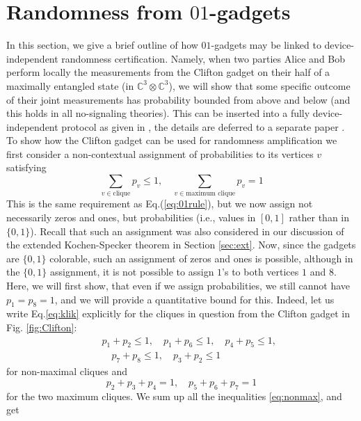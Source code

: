 \documentclass[twocolumn, a4paper, superscriptaddress,nofootinbib, accepted=2020-08-07, hyperref]{quantumarticle}
\def\be{\begin{equation}}
\def\ee{\end{equation}}
\def\ben{\begin{eqnarray}}
\def\een{\end{eqnarray}}
\def\be{\begin{equation}}
\def\ee{\end{equation}}
\begin{document}
\section{Randomness from $01$-gadgets}
In this section, we give a brief outline of how $01$-gadgets may be linked to device-independent randomness certification.
Namely, when two parties Alice and Bob perform locally the measurements from the Clifton gadget on their half of a maximally entangled state (in $\mathbb{C}^3 \otimes \mathbb{C}^3$), we will show that some specific outcome of their joint measurements has probability bounded from above and below (and this holds in all no-signaling theories). This can be
inserted into a fully device-independent protocol as given in \cite{PRL-rand}, the details are deferred to a separate paper \cite{R17}.
To show how the Clifton gadget can be used for randomness amplification we first consider a non-contextual assignment
of probabilities to its vertices $v$ satisfying
\be
\label{eq:klik}
\sum_{v\in \text{clique}}p_v\leq 1,\quad \sum_{v\in \text{maximum clique}} p_v=1
\ee
This is the same requirement as Eq.(\ref{eq:01rule}), but we now assign not necessarily zeros and ones, but probabilities (i.e., values in $[0,1]$ rather than in $\{0,1\}$). Recall that such an assignment was also considered in our discussion of the extended Kochen-Specker theorem in Section \ref{sec:ext}.  
Now, since the gadgets are $\{0,1\}$ colorable, such an assignment of zeros and ones is possible, although in the $\{0,1\}$ assignment, it is not possible to assign $1$'s to both vertices $1$ and $8$. 
Here, we will first show, that even if we assign probabilities, we still cannot have $p_1=p_8=1$, and we will provide a quantitative bound for this.
Indeed, let us write  Eq.\eqref{eq:klik} explicitly for the cliques in question from the Clifton gadget in Fig. \ref{fig:Clifton}:
\ben
\label{eq:nonmax}
&&p_1+p_2\leq 1, \quad p_1+p_6\leq 1, \quad p_4+p_5\leq 1, \nonumber \\
&&\quad p_7+p_8\leq 1, \quad p_3+p_2\leq 1
\een
for non-maximal cliques and 
\be
\label{eq:max}
p_2+p_3+p_4=1, \quad  p_5+p_6+p_7=1
\ee
for the two maximum cliques. 
We sum up all the inequalities \eqref{eq:nonmax}, and get 
\end{document}
